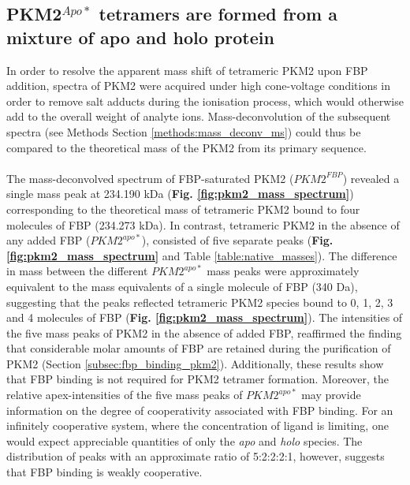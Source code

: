 \subsection{PKM2$^{Apo \ast}$ tetramers are formed from a mixture of apo and holo protein}
In order to resolve the apparent mass shift of tetrameric PKM2 upon FBP addition, spectra of PKM2 were acquired under high cone-voltage conditions in order to remove salt adducts during the ionisation process, which would otherwise add to the overall weight of analyte ions. Mass-deconvolution of the subsequent spectra (see Methods Section \ref{methods:mass_deconv_ms}) could thus be compared to the theoretical mass of the PKM2 from its primary sequence. 
%
%
\\\\
%
%
The mass-deconvolved spectrum of FBP-saturated PKM2 ($PKM2^{FBP}$) revealed a single mass peak at 234.190 kDa (\textbf{Fig. \ref{fig:pkm2_mass_spectrum}}) corresponding to the theoretical mass of tetrameric PKM2 bound to four molecules of FBP (234.273 kDa). In contrast, tetrameric PKM2 in the absence of any added FBP ($PKM2^{apo \ast}$), consisted of five separate peaks (\textbf{Fig. \ref{fig:pkm2_mass_spectrum}} and Table \ref{table:native_masses}). The difference in mass between the different $PKM2^{apo \ast}$ mass peaks were approximately equivalent to the mass equivalents of a single molecule of FBP (340 Da), suggesting that the peaks reflected tetrameric PKM2 species bound to 0, 1, 2, 3 and 4 molecules of FBP (\textbf{Fig. \ref{fig:pkm2_mass_spectrum}}). The intensities of the five mass peaks of PKM2 in the absence of added FBP, reaffirmed the finding that considerable molar amounts of FBP are retained during the purification of PKM2 (Section \ref{subsec:fbp_binding_pkm2}). Additionally, these results show that FBP binding is not required for PKM2 tetramer formation. Moreover, the relative apex-intensities of the five mass peaks of $PKM2^{apo \ast}$ may provide information on the degree of cooperativity associated with FBP binding. For an infinitely cooperative system, where the concentration of ligand is limiting, one would expect appreciable quantities of only the \textit{apo} and \textit{holo} species. The distribution of peaks with an approximate ratio of 5:2:2:2:1, however, suggests that FBP binding is weakly cooperative.


